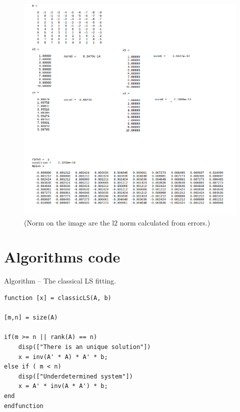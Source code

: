 \documentclass[eng,openany]{mgr}
\begin{document}
\begin{figure}[h]
\centering
\includegraphics[width=0.9\linewidth]{screenshot033}
\caption{(Norm on the image are the l2 norm calculated from errors.)}
\label{fig:screenshot033}
\end{figure}















\chapter{Algorithms code}
Algorithm  -- The classical LS fitting.\\
\begin{lstlisting}
function [x] = classicLS(A, b)

[m,n] = size(A)

if(m >= n || rank(A) == n)
	disp(["There is an unique solution"])
	x = inv(A' * A) * A' * b;
else if ( m < n)
	disp(["Underdetermined system"])
	x = A' * inv(A * A') * b;
end
endfunction
\end{lstlisting}
\end{document}
